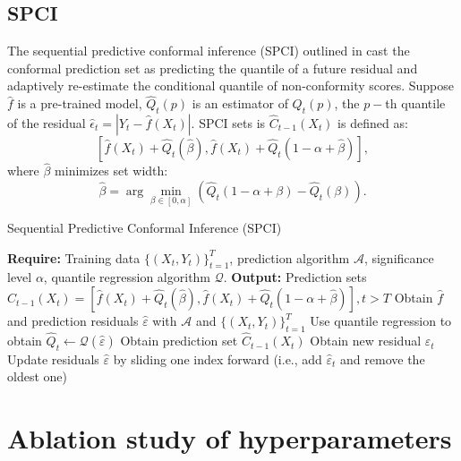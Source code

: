 \subsection{SPCI}
The sequential predictive conformal inference (SPCI) outlined in  cast the conformal prediction set as predicting the quantile of a future residual and adaptively re-estimate the conditional quantile of non-conformity scores. 
Suppose $\hat{f}$ is a pre-trained model, $\widehat{Q}_t(p)$ is an estimator of $Q_t(p)$,  the $p-$th quantile of the residual $\hat{\epsilon}_t=|Y_t-\hat{f}(X_t)|$. SPCI sets is $\hat{C}_{t-1}(X_t)$ is defined as:
$$[\hat{f}(X_t)+\widehat{Q}_t(\hat{\beta}),\hat{f}(X_t)+\widehat{Q}_t(1-\alpha+\hat{\beta})],$$where $\hat{\beta}$ minimizes set width:$$\hat{\beta}=\arg\min_{\beta\in[0,\alpha]}(\widehat{Q}_t(1-\alpha+\beta)-\widehat{Q}_t(\beta)).$$ 
\begin{algorithm}[H]
\caption{Sequential Predictive Conformal Inference (SPCI)}\label{algorithm5}
\begin{algorithmic}[1]
\Statex \hspace{-\algorithmicindent} \textbf{Require:} Training data $\{(X_t, Y_t)\}_{t=1}^T$, prediction algorithm $\mathcal{A}$, significance level $\alpha$, quantile regression algorithm $\mathcal{Q}$.
\Statex \hspace{-\algorithmicindent} \textbf{Output:}  Prediction sets $\hat{C}_{t-1}(X_t)=[\hat{f}(X_t)+\widehat{Q}_t(\hat{\beta}),\hat{f}(X_t)+\widehat{Q}_t(1-\alpha+\hat{\beta})], t > T$
\State Obtain $\hat{f}$ and prediction residuals $\hat{\varepsilon}$ with $\mathcal{A}$ and $\{(X_t, Y_t)\}_{t=1}^T$
    \State Use quantile regression to obtain $\hat{Q}_t \leftarrow \mathcal{Q}(\hat{\varepsilon})$
    \State Obtain prediction set $\hat{C}_{t-1}(X_t)$ 
    \State Obtain new residual $\hat{\varepsilon}_t$
    \State Update residuals $\hat{\varepsilon}$ by sliding one index forward (i.e., add $\hat{\varepsilon}_t$ and remove the oldest one)
\EndFor
\end{algorithmic}
\end{algorithm}


\section{Ablation study of hyperparameters}
\label{Ablation study of hyperparameters}
